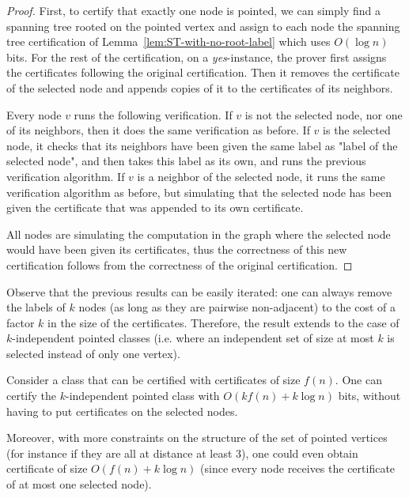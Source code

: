 \documentclass[a4paper,thm-restate,USenglish]{lipics-v2019}
\begin{document}
\begin{proof}
First, to certify that exactly one node is pointed, we can simply find a spanning tree rooted on the pointed vertex and assign to each node the spanning tree certification of Lemma~\ref{lem:ST-with-no-root-label} which uses $O(\log n)$ bits.
For the rest of the certification, on a \emph{yes}-instance, the prover first assigns the certificates following the original certification. 
Then it removes the certificate of the selected node and appends copies of it to the certificates of its neighbors. 

Every node $v$ runs the following verification. If $v$ is not the selected node, nor one of its neighbors, then it does the same verification as before. 
If $v$ is the selected node, it checks that its neighbors have been given the same label as "label of the selected node", and then takes this label as its own, and runs the previous verification algorithm. 
If $v$ is a neighbor of the selected node, it runs the same verification algorithm as before, but simulating that the selected node has been given the certificate that was appended to its own certificate.

All nodes are simulating the computation in the graph where the selected node would have been given its certificates, thus the correctness of this new certification follows from the correctness of the original certification.
\end{proof}

Observe that the previous results can be easily iterated: one can always remove the labels of $k$ nodes (as long as they are pairwise non-adjacent) to the cost of a factor $k$ in the size of the certificates. Therefore, the result extends to the case of $k$-independent pointed classes (i.e. where an independent set of size at most $k$ is selected instead of only one vertex).

\begin{corollary}
\label{coro:pointed}
Consider a class that can be certified with certificates of size $f(n)$. 
One can certify the $k$-independent pointed class with  $O(kf(n)+k\log n)$ bits, without having to put certificates on the selected nodes. 
\end{corollary}

Moreover, with more constraints on the structure of the set of pointed vertices (for instance if they are all at distance at least 3), one could even obtain certificate of size $O(f(n)+k\log n)$ (since every node receives the certificate of at most one selected node).
\end{document}
